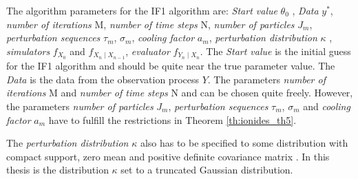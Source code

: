 \documentclass[twoside,openright]{report}
\begin{document}
The algorithm parameters for the IF1 algorithm are: \textit{Start value} $\theta_0$ , \textit{Data} $y^{\ast}$, \textit{number of iterations} M, \textit{number of time steps} N,  \textit{number of particles} $J_m$, \textit{perturbation sequences} $\tau_m$, $\sigma_m$, \textit{cooling factor} $a_m$, \textit{perturbation distribution} $\kappa$ , \textit{simulators} $f_{X_0}$ and $f_{X_n \mid X_{n-1}}$, \textit{evaluator} $f_{Y_n \mid X_n}$. The \textit{Start value} is the initial guess for the IF1 algorithm and should be quite near the true parameter value. The \textit{Data} is the data from the observation process $Y$. The parameters \textit{number of iterations} M and \textit{number of time steps} N and can be chosen quite  freely. However, the parameters  \textit{number of particles} $J_m$, \textit{perturbation sequences} $\tau_m$, $\sigma_m$ and \textit{cooling factor} $a_m$ have to fulfill the restrictions in Theorem \ref{th:ionides_th5}. %

The \textit{perturbation distribution} $\kappa$ also has to be specified to some distribution with compact support, zero mean and positive definite covariance matrix \cite{ionides2011iterated}. In this thesis is the distribution $\kappa$ set to a truncated  Gaussian distribution.   
\end{document}
